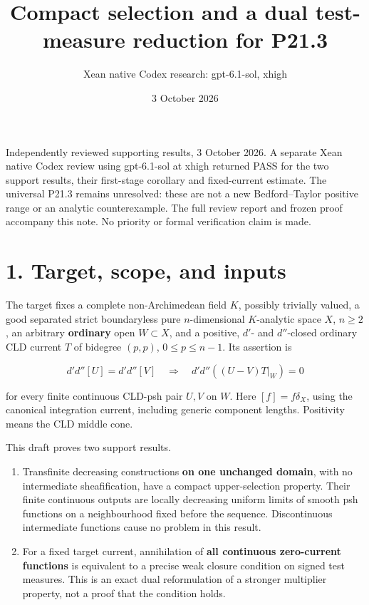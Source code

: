 \documentclass[
  11pt,
]{article}
\title{Compact selection and a dual test-measure reduction for P21.3}
\author{Xean native Codex research: gpt-6.1-sol, xhigh}
\date{3 October 2026}
\providecommand{\tightlist}{%
  \setlength{\itemsep}{0pt}\setlength{\parskip}{0pt}}
\begin{document}
\maketitle

Independently reviewed supporting results, 3 October 2026. A separate
Xean native Codex review using gpt-6.1-sol at xhigh returned PASS for
the two support results, their first-stage corollary and fixed-current
estimate. The universal P21.3 remains unresolved: these are not a new
Bedford--Taylor positive range or an analytic counterexample. The full
review report and frozen proof accompany this note. No priority or formal
verification claim is made.

\section{1. Target, scope, and inputs}\label{target-scope-and-inputs}

The target fixes a complete non-Archimedean field \(K\), possibly
trivially valued, a good separated strict boundaryless pure
\(n\)-dimensional \(K\)-analytic space \(X\), \(n\geq2\), an arbitrary
\textbf{ordinary} open \(W\subset X\), and a positive, \(d'\)- and
\(d''\)-closed ordinary CLD current \(T\) of bidegree \((p,p)\),
\(0\leq p\leq n-1\). Its assertion is

\[
d'd''[U]=d'd''[V]\quad\Longrightarrow\quad
d'd''((U-V)T|_W)=0
\]

for every finite continuous CLD-psh pair \(U,V\) on \(W\). Here
\([f]=f\delta_X\), using the canonical integration current, including
generic component lengths. Positivity means the CLD middle cone.

This draft proves two support results.

\begin{enumerate}
\def\labelenumi{\arabic{enumi}.}
\tightlist
\item
  Transfinite decreasing constructions \textbf{on one unchanged domain},
  with no intermediate sheafification, have a compact upper-selection
  property. Their finite continuous outputs are locally decreasing
  uniform limits of smooth psh functions on a neighbourhood fixed before
  the sequence. Discontinuous intermediate functions cause no problem in
  this result.
\item
  For a fixed target current, annihilation of \textbf{all continuous
  zero-current functions} is equivalent to a precise weak closure
  condition on signed test measures. This is an exact dual reformulation
  of a stronger multiplier property, not a proof that the condition
  holds.
\end{enumerate}
\end{document}
